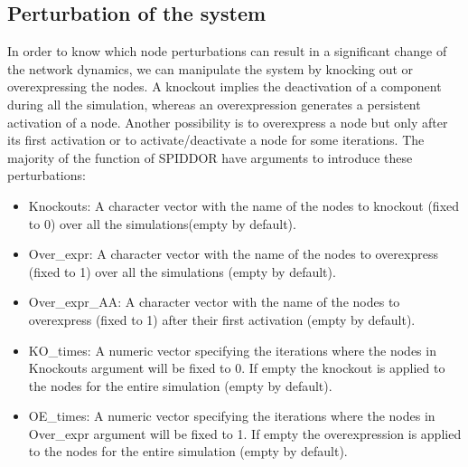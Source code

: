 \documentclass[a4paper]{article}
\begin{document}
\subsection{Perturbation of the system}
In order to know which node perturbations can result in a significant change of the network dynamics, we can manipulate the system by knocking out or overexpressing the nodes. A knockout implies the deactivation of a component during all the simulation, whereas an overexpression generates a persistent activation of a node. Another possibility is to overexpress a node but only after its first activation or to activate/deactivate a node for some iterations. The majority of the function of SPIDDOR have arguments to introduce these perturbations:
\begin{itemize}
  \item{Knockouts:}{ A character vector with the name of the nodes to knockout (fixed to 0) over all the simulations(empty by default).}
  \item{Over\_expr:}{ A character vector with the name of the nodes to overexpress (fixed to 1) over all the simulations (empty by default).}
  \item{Over\_expr\_AA:}{ A character vector with the name of the nodes to overexpress (fixed to 1) after their first activation (empty by default).}
  \item{KO\_times:}{ A numeric vector specifying the iterations where the nodes in Knockouts argument will be fixed to 0. If empty the knockout is applied to the nodes for the entire simulation (empty by default).}
  \item{OE\_times:}{ A numeric vector specifying the iterations where the nodes in Over\_expr argument will be fixed to 1. If empty the overexpression is applied to the nodes for the entire simulation (empty by default).}
\end{itemize}
\end{document}
